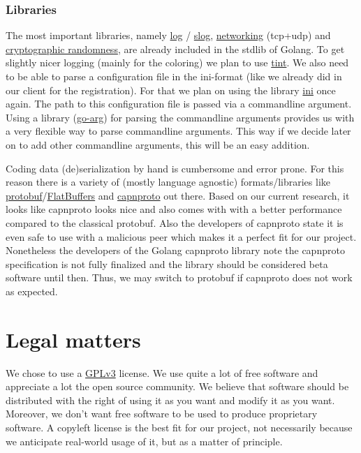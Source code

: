 \documentclass[a4paper,english,10pt,NET]{tumarticle}
\begin{document}
\subsubsection{Libraries}
The most important libraries, namely
\href{https://pkg.go.dev/log}{log}
/
\href{https://pkg.go.dev/log/slog@go1.22.2}{slog},
\href{https://pkg.go.dev/net}{networking} (tcp+udp)
and
\href{https://pkg.go.dev/crypto/rand}{cryptographic randomness},
are already included in the stdlib of Golang.
To get slightly nicer logging (mainly for the coloring) we plan to use \href{github.com/lmittmann/tint}{tint}.
We also need to be able to parse a configuration file in the ini-format (like we already did in our client for the registration).
For that we plan on using the library \href{gopkg.in/ini.v1}{ini} once again.
The path to this configuration file is passed via a commandline argument.
Using a library (\href{https://github.com/alexflint/go-arg}{go-arg}) for parsing the commandline arguments provides us with a very flexible way to parse commandline arguments.
This way if we decide later on to add other commandline arguments, this will be an easy addition.

Coding data (de)serialization by hand is cumbersome and error prone.
For this reason there is a variety of (mostly language agnostic) formats/libraries like \href{https://protobuf.dev/}{protobuf}/\href{https://flatbuffers.dev/}{FlatBuffers} and \href{https://capnproto.org/}{capnproto} out there.
Based on our current research, it looks like capnproto looks nice and also comes with with a better performance compared to the classical protobuf.
Also the developers of capnproto state it is even safe to use with a malicious peer which makes it a perfect fit for our project.
Nonetheless the developers of the Golang capnproto library note the capnproto specification is not fully finalized and the library should be considered beta software until then.
Thus, we may switch to protobuf if capnproto does not work as expected.

\section{Legal matters}


We chose to use a \href{https://www.gnu.org/licenses/quick-guide-gplv3.html}{GPLv3} license.
We use quite a lot of free software and appreciate a lot the open source community. We believe that software should be distributed with the right of using it as you want and modify it as you want. Moreover, we don't want free software to be used to produce proprietary software. A copyleft license is the best fit for our project, not necessarily because we anticipate real-world usage of it, but as a matter of principle.
\end{document}
